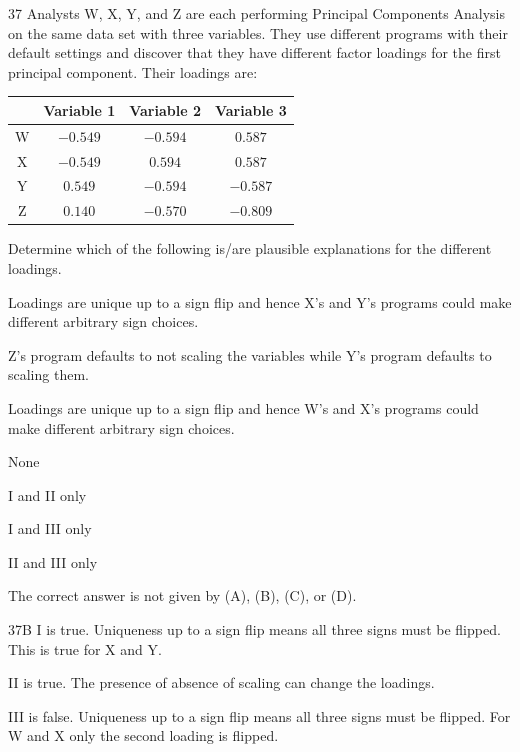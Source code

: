 \begin{question}{37}
Analysts W, X, Y, and Z are each performing Principal Components Analysis on the same data set with three variables. They use different programs with their default settings and discover that they have different factor loadings for the first principal component. Their loadings are:
\begin{center}
\begin{tabular}{|c|c|c|c|}
\hline
  & Variable 1 & Variable 2 & Variable 3 \\ \hline
W & $-0.549$   & $-0.594$   & $0.587$    \\ \hline
X & $-0.549$   & $0.594$    & $0.587$    \\ \hline
Y & $0.549$    & $-0.594$   & $-0.587$   \\ \hline
Z & $0.140$    & $-0.570$   & $-0.809$   \\ \hline
\end{tabular}
\end{center}

Determine which of the following is/are plausible explanations for the different loadings.
\begin{statements}
\item Loadings are unique up to a sign flip and hence X's and Y's programs could make different arbitrary sign choices.
\item Z's program defaults to not scaling the variables while Y's program defaults to scaling them.
\item Loadings are unique up to a sign flip and hence W's and X's programs could make different arbitrary sign choices.
\end{statements}

\begin{choices}
\item None
\item I and II only
\item I and III only
\item II and III only
\item The correct answer is not given by (A), (B), (C), or (D).
\end{choices}
\end{question}
\begin{solution}{37}{B}
I is true. Uniqueness up to a sign flip means all three signs must be flipped. This is true for X and Y.

II is true. The presence of absence of scaling can change the loadings.

III is false. Uniqueness up to a sign flip means all three signs must be flipped. For W and X only the second loading is flipped.
\end{solution}

